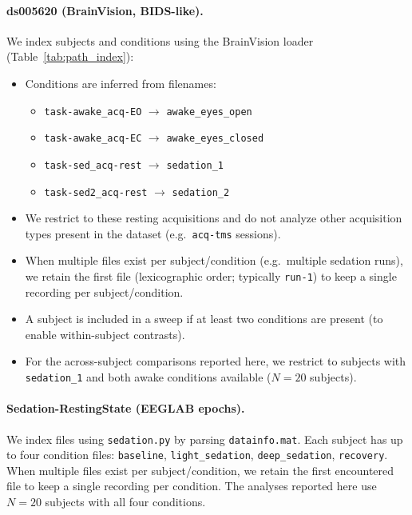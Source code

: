 \documentclass[11pt]{article}
\begin{document}
\paragraph{ds005620 (BrainVision, BIDS-like).}
We index subjects and conditions using the BrainVision loader (Table~\ref{tab:path_index}):
\begin{itemize}[leftmargin=*]
    \item Conditions are inferred from filenames:
    \begin{itemize}[leftmargin=*]
        \item \texttt{task-awake\_acq-EO} $\rightarrow$ \texttt{awake\_eyes\_open}
        \item \texttt{task-awake\_acq-EC} $\rightarrow$ \texttt{awake\_eyes\_closed}
        \item \texttt{task-sed\_acq-rest} $\rightarrow$ \texttt{sedation\_1}
        \item \texttt{task-sed2\_acq-rest} $\rightarrow$ \texttt{sedation\_2}
    \end{itemize}
    \item We restrict to these resting acquisitions and do not analyze other acquisition types present in the dataset (e.g.\ \texttt{acq-tms} sessions).
    \item When multiple files exist per subject/condition (e.g.\ multiple sedation runs), we retain the first file (lexicographic order; typically \texttt{run-1}) to keep a single recording per subject/condition.
    \item A subject is included in a sweep if at least two conditions are present (to enable within-subject contrasts).
    \item For the across-subject comparisons reported here, we restrict to subjects with \texttt{sedation\_1} and both awake conditions available ($N=20$ subjects).
\end{itemize}

\paragraph{Sedation-RestingState (EEGLAB epochs).}
We index files using \texttt{sedation.py} by parsing \texttt{datainfo.mat}. Each subject has up to four condition files:
\texttt{baseline}, \texttt{light\_sedation}, \texttt{deep\_sedation}, \texttt{recovery}.
When multiple files exist per subject/condition, we retain the first encountered file to keep a single recording per condition. The analyses reported here use $N=20$ subjects with all four conditions.
\end{document}
